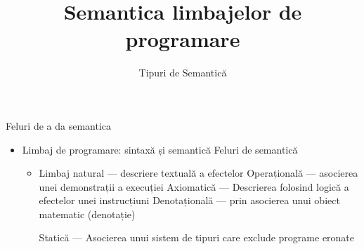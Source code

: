 \documentclass[xcolor=pdftex,romanian,colorlinks]{beamer}
\title[SLP---Tipologie]{Semantica limbajelor de programare}
\subtitle{Tipuri de Semantică}
\begin{document}
\begin{frame}
  \titlepage
\end{frame}

\begin{frame}{Feluri de a da semantica}
\begin{itemize}
  \item Limbaj de programare: sintaxă și semantică
  \vitem Feluri de semantică
  \begin{itemize}
  \item Limbaj natural --- descriere textuală a efectelor
  \vitem Operațională --- asocierea unei demonstrații a execuției
  \vitem Axiomatică --- Descrierea folosind logică a efectelor unei instrucțiuni
  \vitem Denotațională --- prin asocierea unui obiect matematic (denotație)

  \vitem Statică --- Asocierea unui sistem de tipuri care exclude programe eronate
  \end{itemize}
\end{itemize}
\end{frame}
\end{document}
